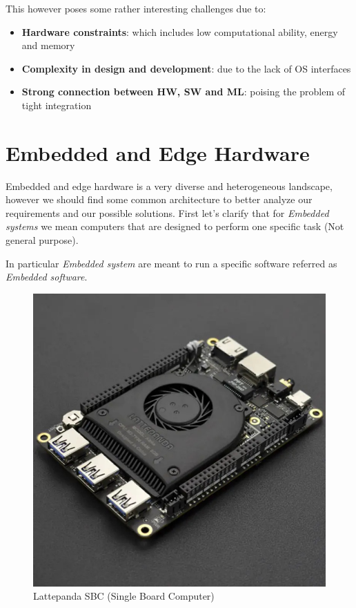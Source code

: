 \documentclass{article}
\begin{document}
    This however poses some rather interesting challenges due to:
    \begin{itemize}
      \item \textbf{Hardware constraints}: which includes low computational ability, energy and memory
      \item \textbf{Complexity in design and development}: due to the lack of OS interfaces
      \item \textbf{Strong connection between HW, SW and ML}: poising the problem of tight integration
    \end{itemize}
  
  \newpage
  
  \section{Embedded and Edge Hardware}
    Embedded and edge hardware is a very diverse and heterogeneous landscape, however we should find some common architecture to better analyze our requirements
    and our possible solutions. First let's clarify that for \emph{Embedded systems} we mean computers that are designed to perform one specific task (Not general purpose).

    In particular \emph{Embedded system} are meant to run a specific software referred as \emph{Embedded software}.
    \begin{figure}[H]
      \includegraphics[scale=0.2]{../Images/Lattepanda.jpg}
      \centering
      \caption{Lattepanda SBC (Single Board Computer)}
    \end{figure}
\end{document}
